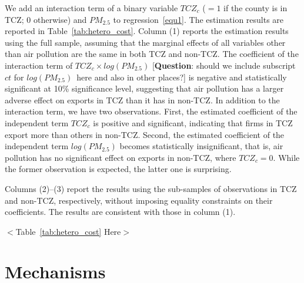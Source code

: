 \documentclass[12pt]{article}
\begin{document}
We add an interaction term of a binary variable $TCZ_{c}$ ($=1$ if the
county is in TCZ; $0$ otherwise) and $PM_{2.5}$ to regression~\ref{equ1}.
The estimation results are reported in Table~\ref{tab:hetero_cost}. Column
(1) reports the estimation results using the full sample, assuming that the
marginal effects of all variables other than air pollution are the same in
both TCZ and non-TCZ. The coefficient of the interaction term of $%
TCZ_{c}\times log(PM_{2.5})$ [\textbf{Question}: should we include subscript 
$ct$ for $log(PM_{2.5})$\ here and also in other places?] is negative and
statistically significant at 10\% significance level, suggesting that air
pollution has a larger adverse effect on exports in TCZ than it has in
non-TCZ. In addition to the interaction term, we have two observations.
First, the estimated coefficient of the independent term $TCZ_{c}$ is
positive and significant, indicating that firms in TCZ export more than
others in non-TCZ. Second, the estimated coefficient of the independent term 
$log(PM_{2.5})$ becomes statistically insignificant, that is, air pollution
has no significant effect on exports in non-TCZ, where $TCZ_{c}=0$. While
the former observation is expected, the latter one is surprising.

Columns (2)--(3) report the results using the sub-samples of observations in
TCZ and non-TCZ, respectively, without imposing equality constraints on
their coefficients. The results are consistent with those in column (1).

\begin{center}
$<$Table~\ref{tab:hetero_cost} Here$>$
\end{center}

\section{Mechanisms}
\end{document}
